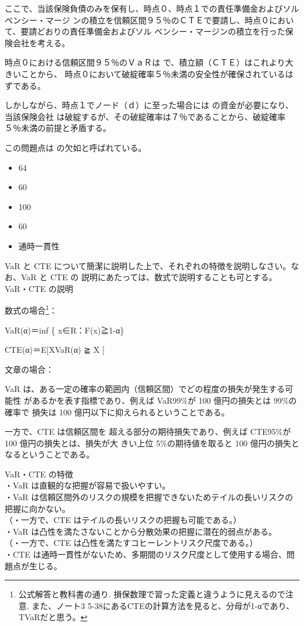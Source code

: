 \documentclass[report,gutter=10mm,fore-edge=10mm,uplatex,dvipdfmx]{jlreq}
\begin{document}
\vspace{1zh}
ここで、当該保険負債のみを保有し、時点０、時点１での責任準備金およびソルベンシー・マージ
ンの積立を信頼区間９５％のＣＴＥで要請し、時点０において、要請どおりの責任準備金およびソル
ベンシー・マージンの積立を行った保険会社を考える。

時点０における信頼区間９５％のＶａＲは
で、積立額（ＣＴＥ）はこれより大きいことから、
時点０において破綻確率５％未満の安全性が確保されているはずである。

しかしながら、時点１でノード（ｄ）に至った場合には
の資金が必要になり、当該保険会社
は破綻するが、その破綻確率は７％であることから、破綻確率５％未満の前提と矛盾する。

この問題点は
の欠如と呼ばれている。
\answer{}
\begin{itemize}
\item[ ① ]  64 
\item[ ② ]  60 
\item[ ③ ]  100 
\item[ ④ ]  60 
\item[ ⑤ ]  通時一貫性
\end{itemize}

VaR と CTE について簡潔に説明した上で、それぞれの特徴を説明しなさい。なお、VaR と CTE の
説明にあたっては、数式で説明することも可とする。
\answer{}
VaR・CTE の説明

数式の場合\footnote{公式解答と教科書の通り. 損保数理で習った定義と違うように見えるので注意. また、ノート3 5-38にあるCTEの計算方法を見ると、分母が1-αであり、TVaRだと思う。}：\par  
VaR(α)＝inf \{ x∈R：F(x)≧1-α\}\par
CTE(α)＝E[X\textbar VaR(α) ≧ X ]

文章の場合：\par
VaR は、ある一定の確率の範囲内（信頼区間）でどの程度の損失が発生する可能性
があるかを表す指標であり、例えば VaR99\%が 100 億円の損失とは 99\%の確率で
損失は 100 億円以下に抑えられるということである。\par 
一方で、CTE は信頼区間を
超える部分の期待損失であり、例えば CTE95\%が 100 億円の損失とは、損失が大
きい上位 5\%の期待値を取ると 100 億円の損失となるということである。

VaR・CTE の特徴\\
・VaR は直観的な把握が容易で扱いやすい。\\
・VaR は信頼区間外のリスクの規模を把握できないためテイルの長いリスクの把握に向かない。\\
（・一方で、CTE はテイルの長いリスクの把握も可能である。）\\
・VaR は凸性を満たさないことから分散効果の把握に潜在的弱点がある。\\
（・一方で、CTE は凸性を満たすコヒーレントリスク尺度である。）\\
・CTE は通時一貫性がないため、多期間のリスク尺度として使用する場合、問題点が生じる。
\end{document}
